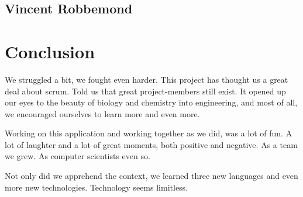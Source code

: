 \documentclass[10pt,a4paper]{report}
\begin{document}
		\subsection{Vincent Robbemond}
			
	
	\clearpage	
	\section{Conclusion}
		We struggled a bit, we fought even harder. This project has thought us a great deal about scrum. Told us that great project-members still exist. It opened up our eyes to the beauty of biology and chemistry into engineering, and most of all, we encouraged ourselves to learn more and even more.
		
		Working on this application and working together as we did, was a lot of fun. A lot of laughter and a lot of great moments, both positive and negative. As a team we grew. As computer scientists even so.
		
		Not only did we apprehend the context, we learned three new languages and even more new technologies. Technology seems limitless. 
	
\end{document}
